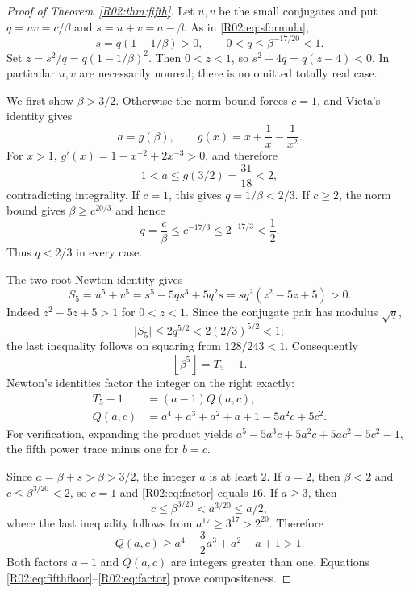\documentclass[11pt,a4paper]{article}
\theoremstyle{definition}\newtheorem{definition}[theorem]{Definition}
\theoremstyle{remark}\newtheorem{remark}[theorem]{Remark}
\newcommand{\floor}[1]{\left\lfloor#1\right\rfloor}
\begin{document}
\begin{proof}[Proof of Theorem~\ref{R02:thm:fifth}]
Let $u,v$ be the small conjugates and put $q=uv=c/\beta$ and
$s=u+v=a-\beta$. As in \eqref{R02:eq:sformula},
\[
 s=q(1-1/\beta)>0,\qquad 0<q\le\beta^{-17/20}<1.
\]
Set $z=s^2/q=q(1-1/\beta)^2$. Then $0<z<1$, so
$s^2-4q=q(z-4)<0$. In particular $u,v$ are necessarily nonreal;
there is no omitted totally real case.

We first show $\beta>3/2$. Otherwise the norm bound forces $c=1$,
and Vieta's identity gives
\[
 a=g(\beta),\qquad g(x)=x+\frac1x-\frac1{x^2}.
\]
For $x>1$, $g'(x)=1-x^{-2}+2x^{-3}>0$, and therefore
\[
 1<a\le g(3/2)=\frac{31}{18}<2,
\]
contradicting integrality. If $c=1$, this gives $q=1/\beta<2/3$.
If $c\ge2$, the norm bound gives $\beta\ge c^{20/3}$ and hence
\[
 q=\frac c\beta\le c^{-17/3}\le2^{-17/3}<\frac12.
\]
Thus $q<2/3$ in every case.

The two-root Newton identity gives
\[
 S_5=u^5+v^5=s^5-5qs^3+5q^2s
 =sq^2(z^2-5z+5)>0.
\]
Indeed $z^2-5z+5>1$ for $0<z<1$. Since the conjugate pair has
modulus $\sqrt q$,
\[
 |S_5|\le2q^{5/2}<2(2/3)^{5/2}<1;
\]
the last inequality follows on squaring from $128/243<1$.
Consequently
\begin{equation}\label{R02:eq:fifthfloor}
 \floor{\beta^5}=T_5-1.
\end{equation}
Newton's identities factor the integer on the right exactly:
\begin{equation}\label{R02:eq:factor}
 \begin{split}
 T_5-1&=(a-1)Q(a,c),\\
 Q(a,c)&=a^4+a^3+a^2+a+1-5a^2c+5c^2.
 \end{split}
\end{equation}
For verification, expanding the product yields
$a^5-5a^3c+5a^2c+5ac^2-5c^2-1$, the fifth power trace minus one
for $b=c$.

Since $a=\beta+s>\beta>3/2$, the integer $a$ is at least $2$.
If $a=2$, then $\beta<2$ and $c\le\beta^{3/20}<2$, so $c=1$ and
\eqref{R02:eq:factor} equals $16$.
If $a\ge3$, then
\[
 c\le\beta^{3/20}<a^{3/20}\le a/2,
\]
where the last inequality follows from
$a^{17}\ge3^{17}>2^{20}$. Therefore
\[
 Q(a,c)\ge a^4-\frac32a^3+a^2+a+1>1.
\]
Both factors $a-1$ and $Q(a,c)$ are integers greater than one.
Equations \eqref{R02:eq:fifthfloor}--\eqref{R02:eq:factor} prove compositeness.
\end{proof}
\end{document}
